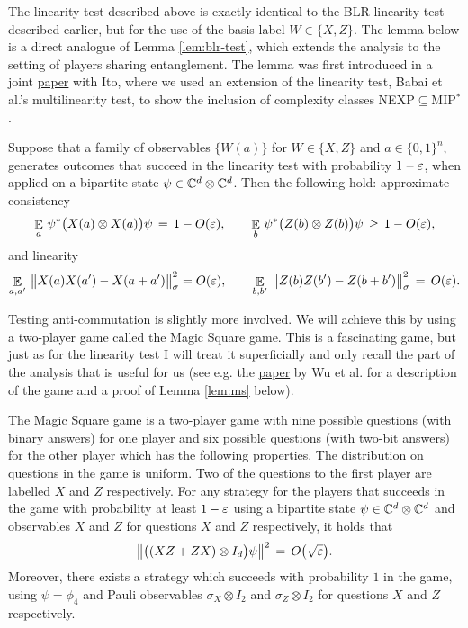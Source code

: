 The linearity test described above is exactly identical to the BLR linearity test described earlier, but for the use of the basis label $W\in\{X,Z\}$. The lemma below is a direct analogue of Lemma \ref{lem:blr-test}, which extends the analysis to the setting of players sharing entanglement. The lemma was first introduced in a joint \href{http://ieeexplore.ieee.org/abstract/document/6375302/}{paper} with Ito, where we used an extension of the linearity test, Babai et al.'s multilinearity test, to show the inclusion of complexity classes NEXP$\subseteq$MIP$^*$.
 
\begin{lemma}\label{lem:com}
Suppose that a family of observables $\{W(a)\}$ for $W\in\{X,Z\}$ and $a\in\{0,1\}^n$, generates outcomes that succeed in the linearity test with probability $1-\varepsilon$, when applied on a bipartite state $\psi\in\mathbb{C}^d\otimes \mathbb{C}^d$. Then the following hold: approximate consistency
$$ \mathop{\mathbb{E}}\displaylimits_a \, \psi^* \big(X(a) \otimes X(a)\big) \psi \,=\,1-O(\varepsilon),\qquad \mathop{\mathbb{E}}\displaylimits_b \, \psi^* \big(Z(b) \otimes Z(b) \big)\psi\,\geq\,1-O(\varepsilon),$$ 
and linearity 
$$
 \mathop{\mathbb{E}}\displaylimits_{a,a'} \,\big\|X(a)X(a')-X(a+a')\big\|_\sigma^2 = O(\varepsilon),\qquad\mathop{\mathbb{E}}\displaylimits_{b,b'}\, \big\|Z(b)Z(b')-Z(b+b')\big\|_\sigma^2  \,=\, O({\varepsilon}).$$
\end{lemma}

Testing anti-commutation is slightly more involved. We will achieve this by using a two-player game called the Magic Square game. This is a fascinating game, but just as for the linearity test I will treat it superficially and only recall the part of the analysis that is useful for us (see e.g. the \href{https://arxiv.org/abs/1512.02074}{paper} by Wu et al. for a description of the game and a proof of Lemma \ref{lem:ms} below). 

\begin{lemma}\label{lem:ms}
The Magic Square game is a two-player game with nine possible questions (with binary answers) for one player and six possible questions (with two-bit answers) for the other player which has the following properties. The distribution on questions in the game is uniform. Two of the questions to the first player are labelled $X$ and $Z$ respectively. For any strategy for the players that succeeds in the game with probability at least $1-\varepsilon$ using  a bipartite state $\psi\in\mathbb{C}^d\otimes \mathbb{C}^d$ and observables $X$ and $Z$ for questions $X$ and $Z$ respectively, it holds that 
\begin{equation}\label{eq:ms-ac}
\big\|\big( (XZ+ZX)\otimes I_d \big)\psi\big\|^2 \,=\, O\big(\sqrt{\varepsilon}\big).
\end{equation}
Moreover, there exists a strategy which succeeds with probability $1$ in the game, using $\psi=\phi_4$ and Pauli observables $\sigma_X \otimes I_2$ and $\sigma_Z\otimes I_2$  for questions $X$ and $Z$ respectively. 
\end{lemma}


